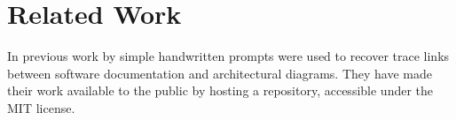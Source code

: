 \chapter{Related Work}
In previous work by 
simple handwritten prompts were used to recover trace links between software documentation and architectural diagrams. They have made their work available to the public by hosting a repository, accessible under the MIT license.

